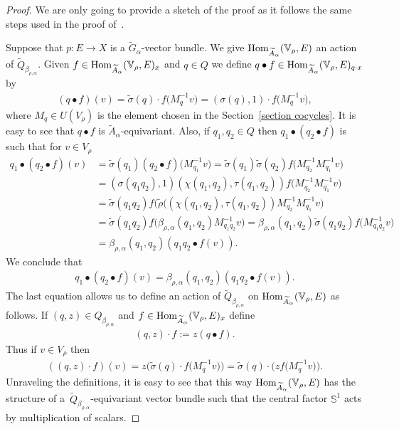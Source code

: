 \documentclass[pdftex]{sigma}
\def\S{\mathbb{S}}
\def\V{\mathbb{V}}
\DeclareMathOperator{\Hom}{\textup{Hom}}
\theoremstyle{definition}
\numberwithin{equation}{section}
\begin{document}
\begin{proof} We are only going to provide a sketch of the proof as it follows the same
steps used in the proof of~\cite[Theorem 2.1]{GomezUribe}.

Suppose that $p\colon E \rightarrow X$ is a $\widetilde{G}_{\alpha}$-vector bundle. We give
$\Hom_{\widetilde{A}_{\alpha}}(\V_{\rho},E)$ an action of
	$\widetilde{Q}_{\beta_{\rho,\alpha}}$. Given $f \in
\Hom_{\widetilde{A}_{\alpha}}(\V_{\rho},E)_{x}$ and
$q\in Q$ we define $q \bullet f \in
\Hom_{\widetilde{A}_{\alpha}}(\V_{\rho},E)_{q\cdot x}$ by
\begin{gather*}
(q\bullet f)(v)=\tilde{\sigma}(q)\cdot f\big(M_{q}^{-1}v\big)
=(\sigma(q),1) \cdot f\big(M_{q}^{-1}v\big),
\end{gather*}
where $M_{q} \in U(V_{\rho})$ is the element chosen in the Section~\ref{section cocycles}.
It is easy to see that $q \bullet f$ is $\widetilde{A}_{\alpha}$-equivariant. Also,
if $q_{1}, q_{2}\in Q$ then $q_{1}\bullet
(q_{2} \bullet f)$ is such that for $v \in V_{\rho}$
\begin{align*}
q_{1}\bullet(q_{2}\bullet f)(v)&=\tilde{\sigma}(q_{1})
(q_{2}\bullet f)\big(M_{q_{1}}^{-1}v\big)=\tilde{\sigma}(q_{1})\tilde{\sigma}(q_{2})
f\big(M_{q_{2}}^{-1}M_{q_{1}}^{-1}v\big)\\
&=(\sigma(q_{1}q_{2}),1)(\chi(q_{1},q_{2}),\tau(q_{1},q_{2}))
f\big(M_{q_{2}}^{-1}M_{q_{1}}^{-1}v\big)\\
&=\tilde{\sigma}(q_{1}q_{2})f(\tilde{\rho}\big((\chi(q_{1},q_{2}),\tau(q_{1},q_{2}))
M_{q_{2}}^{-1}M_{q_{1}}^{-1}v\big)
\\
&=\tilde{\sigma}(q_{1}q_{2})
f\big(\beta_{\rho,\alpha}(q_{1},q_{2})M_{q_{1}q_{2}}^{-1}v\big)=\beta_{\rho,\alpha}(q_{1},q_{2}) \tilde{\sigma}(q_{1}q_{2})
f\big(M_{q_{1}q_{2}}^{-1}v\big)\\
&=\beta_{\rho,\alpha}(q_{1},q_{2})(q_{1}q_{2}\bullet f(v)).
\end{align*}
We conclude that
\begin{gather*}
q_{1}\bullet(q_{2}\bullet
f)(v)=\beta_{\rho,\alpha}(q_{1},q_{2})(q_{1}q_{2}\bullet f(v)).
\end{gather*}
The last equation allows us to define an action of
$\widetilde{Q}_{\beta_{\rho,\alpha}}$ on
$\Hom_{\widetilde{A}_{\alpha}}(\V_{\rho},E)$ as follows. If
$(q, z) \in Q_{\beta_{\rho,\alpha}}$ and $f \in
\Hom_{\widetilde{A}_{\alpha}}(\V_{\rho},E)_{x}$ define
\begin{gather*}
(q,z)\cdot f:=z(q\bullet f).
\end{gather*}
Thus if $v\in V_{\rho}$ then
\begin{gather*}
((q,z)\cdot f)(v)=z\big(\tilde{\sigma}(q)\cdot f\big(M_{q}^{-1}v\big)\big)=
\tilde{\sigma}(q)\cdot \big(zf\big(M_{q}^{-1}v\big)\big).
\end{gather*}
Unraveling the definitions, it is easy to see that this way
$\Hom_{\widetilde{A}_{\alpha}}(\V_{\rho},E)$ has the structure of
a~$\widetilde{Q}_{\beta_{\rho,\alpha}}$-equivariant vector bundle such that
the central factor $\S^{1}$ acts by multiplication of scalars.


\end{proof}
\end{document}
